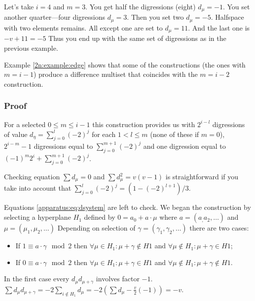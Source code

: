         \begin{example}
            \label{2n:example:edge}
            Let's take $i=4$ and $m=3$. You get half the digressions (eight) $d_\mu=-1$. You set another quarter---four digressions $d_\mu=3$. Then you set two $d_\mu=-5$. Halfspace with two elements remains. All except one are set to $d_\mu=11$. And the last one is $-v+11=-5$ Thus you end up with the same set of digressions as in the previous example.
        \end{example}

        Example \ref{2n:example:edge} shows that some of the constructions (the ones with $m=i-1$) produce a difference multiset that coincides with the $m=i-2$ construction.
    
    \subsubsection{Proof}
        For a selected $0 \leq m \leq i-1$ this construction provides us with $2^{i-l}$ digressions of value $d_\eta=\sum\limits_{j=0}^l(-2)^j$ for each $1<l\leq m$ (none of these if $m=0$), $2^{i-m}-1$ digressions equal to $\sum\limits_{j=0}^{m+1}(-2)^j$ and one digression equal to $(-1)^m 2^i+\sum\limits_{j=0}^{m+1}(-2)^j$.
        
        Checking equation $\sum d_\mu = 0$ and $\sum d_\mu^2 = v(v-1)$ is straightforward if you take into account that $\sum\limits_{j=0}^l(-2)^j=(1-(-2)^{l+1})/3$.
        
        Equations \eqref{apparatus:eq:dsystem} are left to check. We began the construction by selecting a hyperplane $H_1$ defined by $0=a_0+a\cdot \mu$ where $a=(a_,a_2,\ldots)$ and $\mu=(\mu_1,\mu_2,\ldots)$ Depending on selection of $\gamma=(\gamma_1,\gamma_2,\ldots)$ there are two cases:
        \begin{itemize}
            \item If $1 \equiv a\cdot \gamma \mod 2$ then $\forall \mu \in H_1 : \mu+\gamma \notin H1 $ and $\forall \mu \notin H_1 : \mu+\gamma \in H1$;
            \item If $0 \equiv a\cdot \gamma \mod 2$ then $\forall \mu \in H_1 : \mu+\gamma \in H1 $ and $\forall \mu \notin H_1 : \mu+\gamma \notin H1$.
        \end{itemize}
        
        In the first case every $d_\mu d_{\mu+\gamma}$ involves factor $-1$. $\sum d_\mu d_{\mu+\gamma} = -2\sum\limits_{i\notin H_1} d_\mu = -2 (\sum d_\mu - \frac v2 (-1)) = -v$.
        
